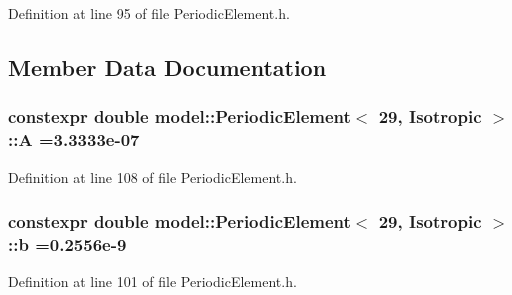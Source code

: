 Definition at line 95 of file Periodic\+Element.\+h.



\subsection{Member Data Documentation}
\hypertarget{structmodel_1_1_periodic_element_3_0129_00_01_isotropic_01_4_a8e5ba5bff431a3e327d7c93800354101}{}
\subsubsection[{A}]{\setlength{\rightskip}{0pt plus 5cm}constexpr double {\bf model\+::\+Periodic\+Element}$<$ 29, {\bf Isotropic} $>$\+::A =3.\+3333e-\/07\hspace{0.3cm}{\ttfamily [static]}}\label{structmodel_1_1_periodic_element_3_0129_00_01_isotropic_01_4_a8e5ba5bff431a3e327d7c93800354101}


Definition at line 108 of file Periodic\+Element.\+h.

\hypertarget{structmodel_1_1_periodic_element_3_0129_00_01_isotropic_01_4_af2627e955d53c1a539b818806c7926ca}{}
\subsubsection[{b}]{\setlength{\rightskip}{0pt plus 5cm}constexpr double {\bf model\+::\+Periodic\+Element}$<$ 29, {\bf Isotropic} $>$\+::b =0.\+2556e-\/9\hspace{0.3cm}{\ttfamily [static]}}\label{structmodel_1_1_periodic_element_3_0129_00_01_isotropic_01_4_af2627e955d53c1a539b818806c7926ca}


Definition at line 101 of file Periodic\+Element.\+h.

\hypertarget{structmodel_1_1_periodic_element_3_0129_00_01_isotropic_01_4_ada99a134c11f80b15b76d975405d6b02}{}
